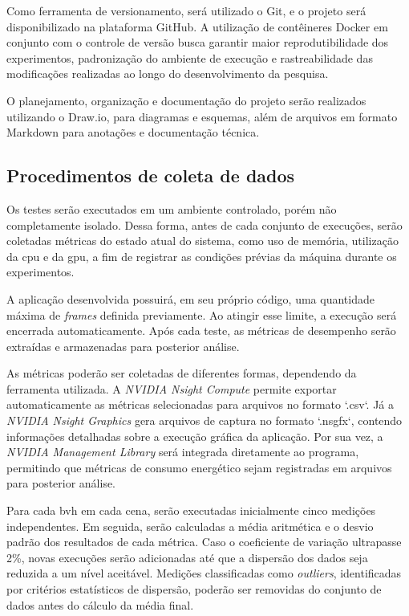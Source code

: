 Como ferramenta de versionamento, será utilizado o Git, e o projeto será disponibilizado na plataforma GitHub. A utilização de contêineres Docker em conjunto com o controle de versão busca garantir maior reprodutibilidade dos experimentos, padronização do ambiente de execução e rastreabilidade das modificações realizadas ao longo do desenvolvimento da pesquisa.

O planejamento, organização e documentação do projeto serão realizados utilizando o Draw.io, para diagramas e esquemas, além de arquivos em formato Markdown para anotações e documentação técnica.

\subsection{Procedimentos de coleta de dados}

Os testes serão executados em um ambiente controlado, porém não completamente isolado. Dessa forma, antes de cada conjunto de execuções, serão coletadas métricas do estado atual do sistema, como uso de memória, utilização da \gls{cpu} e da \gls{gpu}, a fim de registrar as condições prévias da máquina durante os experimentos.

A aplicação desenvolvida possuirá, em seu próprio código, uma quantidade máxima de \textit{frames} definida previamente. Ao atingir esse limite, a execução será encerrada automaticamente. Após cada teste, as métricas de desempenho serão extraídas e armazenadas para posterior análise.

As métricas poderão ser coletadas de diferentes formas, dependendo da ferramenta utilizada. A \textit{NVIDIA Nsight Compute} permite exportar automaticamente as métricas selecionadas para arquivos no formato `.csv`. Já a \textit{NVIDIA Nsight Graphics} gera arquivos de captura no formato `.nsgfx`, contendo informações detalhadas sobre a execução gráfica da aplicação. Por sua vez, a \textit{NVIDIA Management Library} será integrada diretamente ao programa, permitindo que métricas de consumo energético sejam registradas em arquivos para posterior análise.

Para cada \gls{bvh} em cada cena, serão executadas inicialmente cinco medições independentes. Em seguida, serão calculadas a média aritmética e o desvio padrão dos resultados de cada métrica. Caso o coeficiente de variação ultrapasse 2\%, novas execuções serão adicionadas até que a dispersão dos dados seja reduzida a um nível aceitável. Medições classificadas como \textit{outliers}, identificadas por critérios estatísticos de dispersão, poderão ser removidas do conjunto de dados antes do cálculo da média final.

